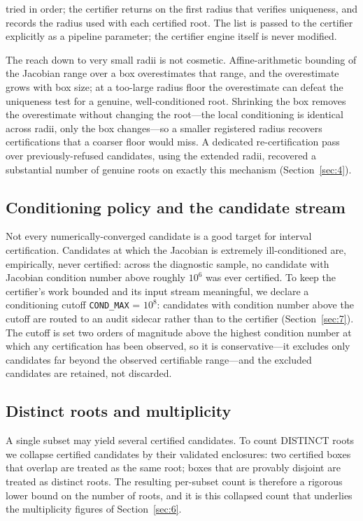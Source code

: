 \documentclass[pdflatex,sn-mathphys-num]{sn-jnl}
\begin{document}
tried in order; the certifier returns on the first radius that verifies uniqueness, and records the radius used with each certified root. The list is passed to the certifier explicitly as a pipeline parameter; the certifier engine itself is never modified.

The reach down to very small radii is not cosmetic. Affine-arithmetic bounding of the Jacobian range over a box overestimates that range, and the overestimate grows with box size; at a too-large radius floor the overestimate can defeat the uniqueness test for a genuine, well-conditioned root. Shrinking the box removes the overestimate without changing the root---the local conditioning is identical
across radii, only the box changes---so a smaller registered radius recovers certifications that a coarser floor would miss. A dedicated re-certification pass over previously-refused candidates, using the extended radii, recovered a substantial number of genuine roots on exactly this mechanism (Section~\ref{sec:4}).

\subsection{Conditioning policy and the candidate stream}\label{sec:3.3}

Not every numerically-converged candidate is a good target for interval certification. Candidates at which the Jacobian is extremely ill-conditioned are, empirically, never certified: across the diagnostic sample, no candidate with Jacobian condition number above roughly $10^{6}$ was ever certified.
To keep the certifier's work bounded and its input stream meaningful, we declare a conditioning cutoff \texttt{COND\_MAX} = $10^{8}$: candidates with condition number above the cutoff are routed to an audit sidecar rather than to the certifier (Section~\ref{sec:7}). The cutoff is set two orders of magnitude above the highest condition number at which any certification has been observed, so it is conservative---it excludes only candidates far beyond the observed certifiable range---and the excluded candidates are retained, not discarded.

\subsection{Distinct roots and multiplicity}\label{sec:3.4}

A single subset may yield several certified candidates. To count DISTINCT roots we collapse certified candidates by their validated enclosures: two certified boxes that overlap are treated as the same root; boxes that are provably disjoint are treated as distinct roots. The resulting per-subset count
is therefore a rigorous lower bound on the number of roots, and it is this collapsed count that underlies the multiplicity figures of Section~\ref{sec:6}.
\end{document}

